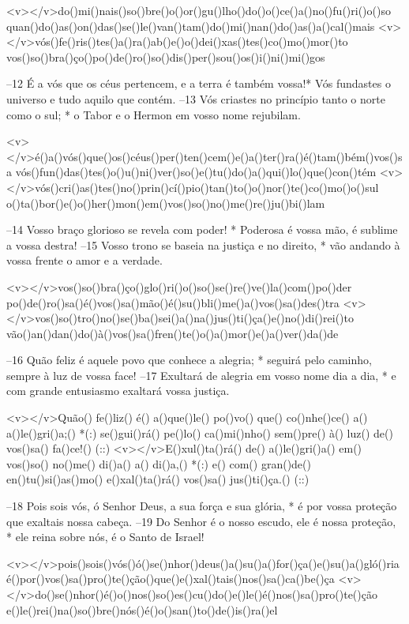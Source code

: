 <v></v>do()mi()nais()so()bre()o()or()gu()lho()do()o()ce()a()no()fu()ri()o()so
quan()do()as()on()das()se()le()van()tam()do()mi()nan()do()as()a()cal()mais
<v></v>vós()fe()ris()tes()a()ra()ab()e()o()dei()xas()tes()co()mo()mor()to
vos()so()bra()ço()po()de()ro()so()dis()per()sou()os()i()ni()mi()gos

–12 É a vós que os céus pertencem, e a terra é também vossa!*
Vós fundastes o universo e tudo aquilo que contém.
–13 Vós criastes no princípio tanto o norte como o sul; *
o Tabor e o Hermon em vosso nome rejubilam.

<v></v>é()a()vós()que()os()céus()per()ten()cem()e()a()ter()ra()é()tam()bém()vos()sa
vós()fun()das()tes()o()u()ni()ver()so()e()tu()do()a()qui()lo()que()con()tém
<v></v>vós()cri()as()tes()no()prin()cí()pio()tan()to()o()nor()te()co()mo()o()sul
o()ta()bor()e()o()her()mon()em()vos()so()no()me()re()ju()bi()lam

–14 Vosso braço glorioso se revela com poder! *
Poderosa é vossa mão, é sublime a vossa destra!
–15 Vosso trono se baseia na justiça e no direito, *
vão andando à vossa frente o amor e a verdade.

<v></v>vos()so()bra()ço()glo()ri()o()so()se()re()ve()la()com()po()der
po()de()ro()sa()é()vos()sa()mão()é()su()bli()me()a()vos()sa()des()tra
<v></v>vos()so()tro()no()se()ba()sei()a()na()jus()ti()ça()e()no()di()rei()to
vão()an()dan()do()à()vos()sa()fren()te()o()a()mor()e()a()ver()da()de

–16 Quão feliz é aquele povo que conhece a alegria; *
seguirá pelo caminho, sempre à luz de vossa face!
–17 Exultará de alegria em vosso nome dia a dia, *
e com grande entusiasmo exaltará vossa justiça.

<v></v>Quão() fe()liz() é() a()que()le() po()vo() que() co()nhe()ce() a() a()le()gri()a;() *(:)
se()gui()rá() pe()lo() ca()mi()nho() sem()pre() à() luz() de() vos()sa() fa()ce!() (::)
<v></v>E()xul()ta()rá() de() a()le()gri()a() em() vos()so() no()me() di()a() a() di()a,() *(:)
e() com() gran()de() en()tu()si()as()mo() e()xal()ta()rá() vos()sa() jus()ti()ça.() (::)

–18 Pois sois vós, ó Senhor Deus, a sua força e sua glória, *
é por vossa proteção que exaltais nossa cabeça.
–19 Do Senhor é o nosso escudo, ele é nossa proteção, *
ele reina sobre nós, é o Santo de Israel!

<v></v>pois()sois()vós()ó()se()nhor()deus()a()su()a()for()ça()e()su()a()gló()ria
é()por()vos()sa()pro()te()ção()que()e()xal()tais()nos()sa()ca()be()ça
<v></v>do()se()nhor()é()o()nos()so()es()cu()do()e()le()é()nos()sa()pro()te()ção
e()le()rei()na()so()bre()nós()é()o()san()to()de()is()ra()el


